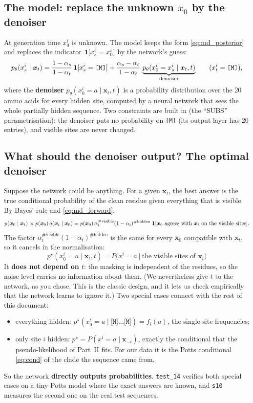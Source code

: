 \subsection{The model: replace the unknown $x_0$ by the denoiser}
At generation time $x^i_0$ is unknown. The model keeps the form \eqref{eq:md_posterior} and replaces the indicator
$\mathbf{1}[x^i_s=x^i_0]$ by the network's guess:
\begin{equation}\label{eq:md_model}
p_\theta(x^i_s\mid\bm x_t)=\frac{1-\alpha_s}{1-\alpha_t}\,\mathbf{1}[x^i_s=\texttt{[M]}]+\frac{\alpha_s-\alpha_t}{1-\alpha_t}\,
\underbrace{p_\theta(x^i_0=x^i_s\mid\bm x_t,t)}_{\text{denoiser}}\qquad(x^i_t=\texttt{[M]}),
\end{equation}
where the \textbf{denoiser} $p_\theta(x^i_0=a\mid\bm x_t,t)$ is a probability distribution over the 20 amino acids
for every hidden site, computed by a neural network that sees the whole partially hidden sequence. Two
constraints are built in (the ``SUBS'' parametrisation): the denoiser puts no probability on \texttt{[M]} (its
output layer has 20 entries), and visible sites are never changed.

\subsection{What should the denoiser output? The optimal denoiser}\label{sec:md_optimal}
Suppose the network could be anything. For a given $\bm x_t$, the best answer is the true conditional probability
of the clean residue given everything that is visible. By Bayes' rule and \eqref{eq:md_forward},
\[
p(\bm x_0\mid\bm x_t)\propto p(\bm x_0)\,q(\bm x_t\mid\bm x_0)
=p(\bm x_0)\,\alpha_t^{\#\text{visible}}(1-\alpha_t)^{\#\text{hidden}}\;\mathbf{1}[\bm x_0\text{ agrees with }\bm x_t\text{ on the visible sites}].
\]
The factor $\alpha_t^{\#\text{visible}}(1-\alpha_t)^{\#\text{hidden}}$ is the same for every $\bm x_0$ compatible with
$\bm x_t$, so it cancels in the normalisation:
\begin{equation}\label{eq:md_opt}
\boxed{\;p^\star(x^i_0=a\mid\bm x_t,t)=P\big(x^i=a\ \big|\ \text{the visible sites of }\bm x_t\big)\;}
\end{equation}
It \textbf{does not depend on $t$}: the masking is independent of the residues, so the noise level carries no
information about them. (We nevertheless give $t$ to the network, as you chose. This is the classic design, and
it lets us check empirically that the network learns to ignore it.) Two special cases connect with the rest of
this document:
\begin{itemize}[nosep]
\item everything hidden: $p^\star(x^i_0=a\mid\texttt{[M]}\dots\texttt{[M]})=f_i(a)$, the single-site frequencies;
\item only site $i$ hidden: $p^\star=P(x^i=a\mid\bm x_{-i})$, exactly the conditional that the pseudo-likelihood of
      Part~II fits. For our data it is the Potts conditional \eqref{eq:cond} of the clade the sequence came from.
\end{itemize}
So the network \textbf{directly outputs probabilities}. \texttt{test\_14} verifies both special cases on a tiny Potts model
where the exact answers are known, and \texttt{s10} measures the second one on the real test sequences.

